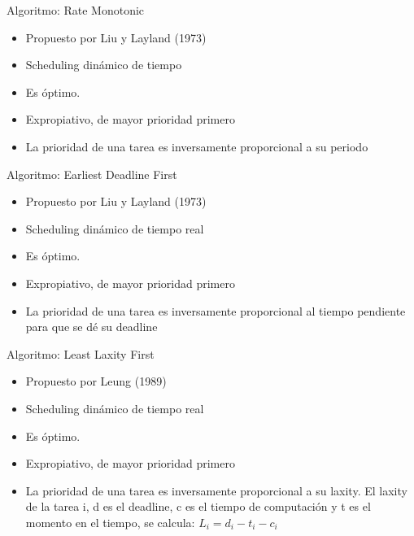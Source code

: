 \documentclass{beamer}
\begin{document}
\begin{frame}{Algoritmo: Rate Monotonic} 
\begin{itemize} 
   \item Propuesto por Liu y Layland (1973) 
   \item Scheduling dinámico de tiempo  
   \item Es óptimo. 
   \item Expropiativo, de mayor prioridad primero 
   \item La prioridad de una tarea es inversamente proporcional a su periodo 
\end{itemize} 
\end{frame} 
\begin{frame}{Algoritmo: Earliest Deadline First} 
\begin{itemize} 
   \item Propuesto por Liu y Layland (1973) 
   \item Scheduling dinámico de tiempo real 
   \item Es óptimo. 
   \item Expropiativo, de mayor prioridad primero 
   \item La prioridad de una tarea es inversamente proporcional al tiempo pendiente para que se dé su deadline 
\end{itemize} 
\end{frame} 
\begin{frame}{Algoritmo: Least Laxity First} 
\begin{itemize} 
   \item Propuesto por Leung (1989) 
   \item Scheduling dinámico de tiempo real 
   \item Es óptimo. 
   \item Expropiativo, de mayor prioridad primero 
   \item La prioridad de una tarea es inversamente proporcional a su laxity. El laxity de la tarea i, d es el deadline, c es el tiempo de computación y t es el momento en el tiempo, se calcula: \( L_{i} = d_{i} - t_{i} - c_{i}\)  
\end{itemize} 
\end{frame} 
\end{document}
